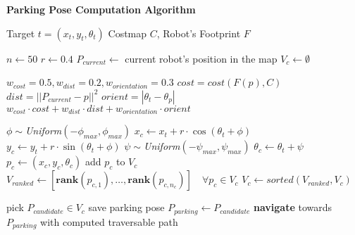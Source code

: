 \begin{algorithm}[H]
    \caption{\textbf{Parking Pose Computation Algorithm}}
    \label{alg:parking}
    \begin{algorithmic}[1]
    \Require Target $t = (x_t, y_t, \theta_t)$
    \Require Costmap $C$, Robot's Footprint $F$

    \State $n \gets 50$ 
    \State $r \gets 0.4$ 
    \State $P_{current} \gets$ current robot's position in the map
    \State $V_c \gets \emptyset$  

        \State $w_{cost} = 0.5, w_{dist} = 0.2, w_{orientation} = 0.3$ 
        \State $cost = cost(F(p), C)$ 
        \State $dist = ||P_{current} - p|| ^2$ 
        \State $orient = | \theta_t - \theta_p |$ 
        \State \Return $w_{cost} \cdot cost + w_{dist} \cdot dist + w_{orientation} \cdot orient$
    \EndFunction

        \State $\phi \sim $\textit{Uniform}$(-\phi_{max}, \phi_{max})$ 
        \State $x_c \gets x_t + r \cdot \cos(\theta_t + \phi)$ 
        \State $y_c \gets y_t + r \cdot \sin(\theta_t + \phi)$ 
        \State $\psi \sim $\textit{Uniform}$(-\psi_{max}, \psi_{max})$ 
        \State $\theta_c \gets \theta_t + \psi$ 
        \State $p_c \gets (x_c, y_c, \theta_c)$ 
        \State {}
            \State add $p_c$ to $V_c$
        \EndIf
    \EndFor
    \State $V_{ranked} \gets \left[\textbf{rank}(p_{c,1}), \ldots, \textbf{rank}(p_{c, n_c})\right] 
        \quad \forall p_c \in V_c $
    \State $V_{c} \gets \textit{sorted}(V_{ranked}, V_c) $ 

    \Repeat 
        \State pick {$P_{candidate} \in V_c$} 
            \State save parking pose $P_{parking} \gets P_{candidate}$
        \EndIf
        \State \textbf{navigate} towards $P_{parking}$ with computed traversable path
    \EndIf
    \end{algorithmic}
\end{algorithm}

